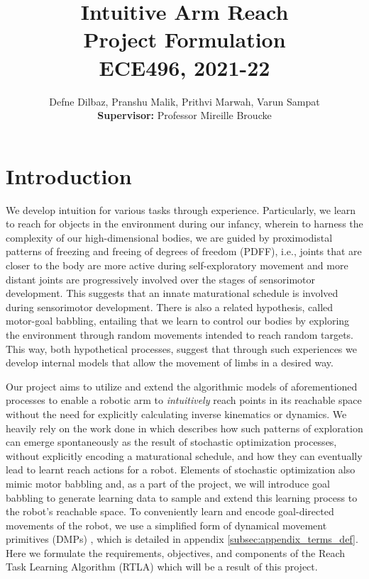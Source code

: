 \documentclass[10pt]{article}
\date{}
\begin{document}
\title{\vspace{-1cm}\textbf{\Large{Intuitive Arm Reach}} \\ \Large{Project Formulation} \\ \textbf{\small{ECE496, 2021-22}}\\\vspace{-0.3cm}}
\author{Defne Dilbaz, Pranshu Malik, Prithvi Marwah, Varun Sampat \\\small{\textbf{Supervisor:}} Professor Mireille Broucke \vspace{-3cm}}

\maketitle

\section{Introduction}
We develop intuition for various tasks through experience. Particularly, we learn to reach for objects in the environment during our infancy, wherein to harness the complexity of our high-dimensional bodies, we are guided by proximodistal patterns of freezing and freeing of degrees of freedom (PDFF), i.e., joints that are closer to the body are more active during self-exploratory movement and more distant joints are progressively involved over the stages of sensorimotor development. This suggests that an innate maturational schedule is involved during sensorimotor development. There is also a related hypothesis, called motor-goal babbling, entailing that we learn to control our bodies by exploring the environment through random movements intended to reach random targets. This way, both hypothetical processes, suggest that through such experiences we develop internal models that allow the movement of limbs in a desired way.

Our project aims to utilize and extend the algorithmic models of aforementioned processes to enable a robotic arm to \emph{intuitively} reach points in its reachable space without the need for explicitly calculating inverse kinematics or dynamics. We heavily rely on the work done in \cite{pdff} which describes how such patterns of exploration can emerge spontaneously as the result of stochastic optimization processes, without explicitly encoding a maturational schedule, and how they can eventually lead to learnt reach actions for a robot. Elements of stochastic optimization also mimic motor babbling and, as a part of the project, we will introduce goal babbling to generate learning data to sample and extend this learning process to the robot's reachable space. To conveniently learn and encode goal-directed movements of the robot, we use a simplified form of dynamical movement primitives (DMPs) \cite{dmps}, which is detailed in appendix \ref{subsec:appendix_terms_def}. Here we formulate the requirements, objectives, and components of the Reach Task Learning Algorithm (RTLA) which will be a result of this project.
\end{document}
